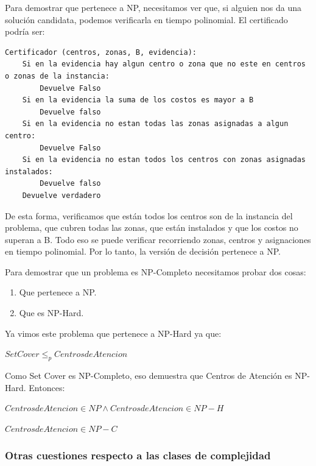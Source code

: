 \documentclass[12pt]{article}
\begin{document}
        Para demostrar que pertenece a NP, necesitamos ver que, si alguien nos da una solución candidata, podemos verificarla en tiempo polinomial. El certificado podría ser:

\begin{lstlisting}[style=pseudo]
Certificador (centros, zonas, B, evidencia):
	Si en la evidencia hay algun centro o zona que no este en centros o zonas de la instancia:
		Devuelve Falso
	Si en la evidencia la suma de los costos es mayor a B
		Devuelve falso
	Si en la evidencia no estan todas las zonas asignadas a algun centro:
		Devuelve Falso
	Si en la evidencia no estan todos los centros con zonas asignadas instalados:
		Devuelve falso
	Devuelve verdadero
\end{lstlisting}

            De esta forma, verificamos que están todos los centros son de la instancia del problema, que cubren todas las zonas, que están instalados y que los costos no superan a B. Todo eso se puede verificar recorriendo zonas, centros y asignaciones en tiempo polinomial. Por lo tanto, la versión de decisión pertenece a NP.

            Para demostrar que un problema es NP-Completo necesitamos probar dos cosas:
            \begin{enumerate}
                \item Que pertenece a NP.
                \item Que es NP-Hard.
            \end{enumerate}

            Ya vimos este problema que pertenece a NP-Hard ya que: 
            \begin{center}
                $Set Cover \leq_p Centros de Atencion$
            \end{center}
    
            Como Set Cover es NP-Completo, eso demuestra que Centros de Atención es NP-Hard.
            Entonces:
            \begin{center}
            $Centros de Atencion \in NP \wedge Centros de Atencion \in NP-H$

            $Centros de Atencion \in NP-C$
            \end{center}

        \subsubsection{Otras cuestiones respecto a las clases de complejidad}
\end{document}
